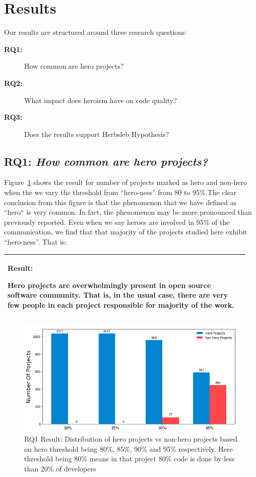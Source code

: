 \documentclass[smallextended]{svjour3}
\newenvironment{result}
{\vspace{0.15cm}
\noindent\begin{minipage}{\linewidth}
\begin{center}
\arrayrulecolor{lightgray}
\begin{tabular}{|p{0.95\linewidth}|}
\hline%
\rowcolor{gray!50}%
\textbf{Result:}~%
}
{\\\hline
\end{tabular}
\end{center}
\end{minipage}
\vspace{0.15cm}
}
\begin{document}
\section{Results}
\label{sec:Results}
Our results are structured around three research questions:
\begin{description}
    \item[{\bf RQ1:}] How common are hero projects?
    \item[{\bf RQ2:}] What    impact  does heroism  have  on  code quality?
    \item[{\bf RQ3:}] Does the results support Herbsleb Hypothesis?
\end{description}


\subsection*{\textbf{RQ1: \textit{How common are hero projects?}}}

Figure~\ref{fig:RQ1_following} shows the result for number of projects marked as hero and non-hero when the we vary the threshold from ``hero-ness''
from 80 to 95\%.The clear conclusion from this figure is
 that the phenomenon  that we have defined as ``hero``
 is very common. In fact, the phenomenon
 may be more pronounced than previously reported.
 Even when we say heroes are involved in 95\% of
 the communication, we find that that majority of the
 projects studied here exhibit ``hero-ness''. That is:

\begin{result}
Hero projects are overwhelmingly present in open source software community. That is, in the usual case,
 there are very few people in each project responsible for majority of the work.
\end{result}

 

\begin{figure}
\includegraphics[width=\linewidth]{RQ1_Code.png}
\caption{RQ1 Result: Distribution of hero projects vs non-hero projects based on hero threshold being 80\%, 85\%, 90\% and 95\% respectively. Here threshold being 80\% means in that project 80\% code is done by less than 20\% of developers}
\label{fig:RQ1_following}
\end{figure}
\end{document}
